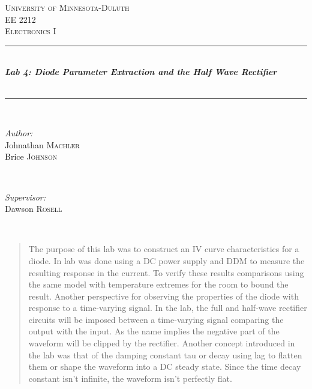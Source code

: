 \documentclass[10pt,a4paper]{article}
\begin{document}
\begin{titlepage}
\newcommand{\HRule}{\rule{\linewidth}{0.5mm}} %
\center %
\textsc{\LARGE University of Minnesota-Duluth}\\[1.5cm] %
\textsc{\Large EE 2212}\\[0.5cm] %
\textsc{\large Electronics I}\\[0.5cm] %
\HRule \\[0.4cm]
{ \huge \bfseries \emph{{\color{black}Lab 4: Diode Parameter Extraction and the Half Wave Rectifier }}}\\[0.4cm] %
{\color{black}{\large \today}}\\
\HRule \\[1cm]


\begin{minipage}{0.4\textwidth}
\begin{flushleft} \large
\emph{Author:}\\
Johnathan \textsc{Machler}\\
Brice  \textsc{Johnson }
\end{flushleft}
\end{minipage}
~
\begin{minipage}{0.4\textwidth}
\begin{flushright} \large
\emph{Supervisor:} \\
Dawson \textsc{Rosell} %
\end{flushright}


\end{minipage}\\[1cm] %

\begin{abstract}
The purpose of this lab was to construct an IV curve characteristics for a diode. In lab was done using a DC power supply and DDM to measure the resulting response in the current. To verify these results comparisons using the same model with temperature extremes for the room to bound the result.  Another perspective for observing the properties of the diode with response to a time-varying signal.  In the lab, the full and half-wave rectifier circuits will be imposed between a time-varying signal comparing the output with the input.  As the name implies the negative part of the waveform will be clipped by the rectifier. Another concept introduced in the lab was that of the damping constant tau or decay using lag to flatten them or shape the waveform into a DC steady state. Since the time decay constant isn't infinite, the waveform isn't perfectly flat. 
\end{abstract}
\vfill %

\end{titlepage}
\end{document}
